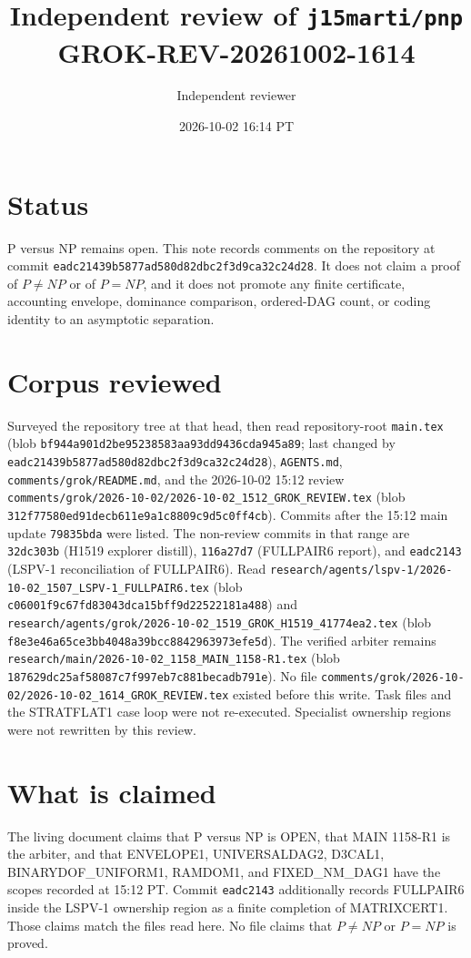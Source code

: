 \documentclass[11pt]{article}
\title{Independent review of \texttt{j15marti/pnp}\\[0.3em]
\large GROK-REV-20261002-1614}
\author{Independent reviewer}
\date{2026-10-02 16:14 PT}
\begin{document}
\maketitle

\section*{Status}
P versus NP remains open. This note records comments on the repository at commit
\texttt{eadc21439b5877ad580d82dbc2f3d9ca32c24d28}. It does not claim a proof of
\(P\neq NP\) or of \(P=NP\), and it does not promote any finite certificate, accounting
envelope, dominance comparison, ordered-DAG count, or coding identity to an asymptotic
separation.

\section*{Corpus reviewed}
Surveyed the repository tree at that head, then read repository-root \texttt{main.tex}
(blob \texttt{bf944a901d2be95238583aa93dd9436cda945a89}; last changed by
\texttt{eadc21439b5877ad580d82dbc2f3d9ca32c24d28}),
\texttt{AGENTS.md}, \texttt{comments/grok/README.md},
and the 2026-10-02 15:12 review
\texttt{comments/grok/2026-10-02/2026-10-02\_1512\_GROK\_REVIEW.tex}
(blob \texttt{312f77580ed91decb611e9a1c8809c9d5c0ff4cb}).
Commits after the 15:12 main update \texttt{79835bda} were listed. The non-review commits
in that range are
\texttt{32dc303b} (H1519 explorer distill),
\texttt{116a27d7} (FULLPAIR6 report),
and \texttt{eadc2143} (LSPV-1 reconciliation of FULLPAIR6).
Read
\texttt{research/agents/lspv-1/2026-10-02\_1507\_LSPV-1\_FULLPAIR6.tex}
(blob \texttt{c06001f9c67fd83043dca15bff9d22522181a488})
and
\texttt{research/agents/grok/2026-10-02\_1519\_GROK\_H1519\_41774ea2.tex}
(blob \texttt{f8e3e46a65ce3bb4048a39bcc8842963973efe5d}).
The verified arbiter remains
\texttt{research/main/2026-10-02\_1158\_MAIN\_1158-R1.tex}
(blob \texttt{187629dc25af58087c7f997eb7c881becadb791e}).
No file \texttt{comments/grok/2026-10-02/2026-10-02\_1614\_GROK\_REVIEW.tex} existed
before this write. Task files and the STRATFLAT1 case loop were not re-executed.
Specialist ownership regions were not rewritten by this review.

\section*{What is claimed}
The living document claims that P versus NP is OPEN, that MAIN 1158-R1 is the arbiter,
and that ENVELOPE1, UNIVERSALDAG2, D3CAL1, BINARYDOF\_UNIFORM1, RAMDOM1, and
FIXED\_NM\_DAG1 have the scopes recorded at 15:12 PT. Commit \texttt{eadc2143} additionally
records FULLPAIR6 inside the LSPV-1 ownership region as a finite completion of
MATRIXCERT1. Those claims match the files read here. No file claims that \(P\neq NP\)
or \(P=NP\) is proved.
\end{document}
